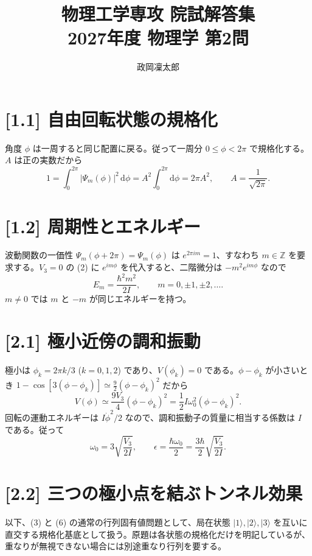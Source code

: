 \documentclass[11pt,a4paper]{article}
\title{物理工学専攻 院試解答集\\2027年度 物理学 第2問}
\author{政岡凜太郎}
\date{}
\begin{document}
\maketitle

\section*{[1.1] 自由回転状態の規格化}
角度 $\phi$ は一周すると同じ配置に戻る。従って一周分 $0\leq\phi<2\pi$ で規格化する。$A$ は正の実数だから
\begin{equation}
1=\int_0^{2\pi}|\Psi_m(\phi)|^2\,\mathrm d\phi
 =A^2\int_0^{2\pi}\mathrm d\phi=2\pi A^2,
\qquad \boxed{A=\frac{1}{\sqrt{2\pi}}}.
\end{equation}

\section*{[1.2] 周期性とエネルギー}
波動関数の一価性 $\Psi_m(\phi+2\pi)=\Psi_m(\phi)$ は $e^{2\pi i m}=1$、すなわち $m\in\mathbb Z$ を要求する。$V_3=0$ の (2) に $e^{im\phi}$ を代入すると、二階微分は $-m^2e^{im\phi}$ なので
\begin{equation}
\boxed{E_m=\frac{\hbar^2m^2}{2I}},\qquad m=0,\pm1,\pm2,\ldots.
\end{equation}
$m\neq0$ では $m$ と $-m$ が同じエネルギーを持つ。

\section*{[2.1] 極小近傍の調和振動}
極小は $\phi_k=2\pi k/3$ ($k=0,1,2$) であり、$V(\phi_k)=0$ である。$\phi-\phi_k$ が小さいとき $1-\cos[3(\phi-\phi_k)]\simeq\tfrac92(\phi-\phi_k)^2$ だから
\begin{equation}
V(\phi)\simeq\frac{9V_3}{4}(\phi-\phi_k)^2
=\frac12 I\omega_0^2(\phi-\phi_k)^2.
\end{equation}
回転の運動エネルギーは $I\dot\phi^2/2$ なので、調和振動子の質量に相当する係数は $I$ である。従って
\begin{equation}
\boxed{\omega_0=3\sqrt{\frac{V_3}{2I}}},\qquad
\boxed{\epsilon=\frac{\hbar\omega_0}{2}=\frac{3\hbar}{2}\sqrt{\frac{V_3}{2I}}}.
\end{equation}

\section*{[2.2] 三つの極小点を結ぶトンネル効果}
以下、(3) と (6) の通常の行列固有値問題として、局在状態 $|1\rangle,|2\rangle,|3\rangle$ を互いに直交する規格化基底として扱う。原題は各状態の規格化だけを明記しているが、重なりが無視できない場合には別途重なり行列を要する。
\end{document}
